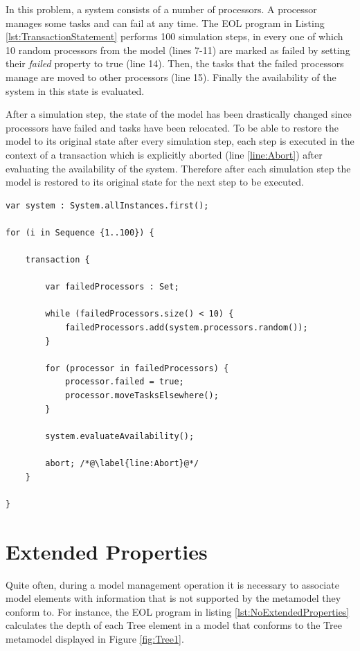 In this problem, a system consists of a number of processors. A processor manages some tasks and can fail at any time. The EOL program in Listing \ref{lst:TransactionStatement} performs 100 simulation steps, in every one of which 10 random processors from the model (lines 7-11) are marked as failed by setting their \emph{failed} property to true (line 14). Then, the tasks that the failed processors manage are moved to other processors (line 15). Finally the availability of the system in this state is evaluated.

After a simulation step, the state of the model has been drastically changed since processors have failed and tasks have been relocated. To be able to restore the model to its original state after every simulation step, each step is executed in the context of a transaction which is explicitly aborted (line \ref{line:Abort}) after evaluating the availability of the system. Therefore after each simulation step the model is restored to its original state for the next step to be executed.

\begin{lstlisting}[basicstyle=\ttfamily\footnotesize, flexiblecolumns=true, numbers=none, nolol=true, caption=Example of a for statement, label=lst:TransactionStatement, numbers=left, language=EOL, tabsize=2]
var system : System.allInstances.first();

for (i in Sequence {1..100}) {

	transaction {
		
		var failedProcessors : Set; 
		
		while (failedProcessors.size() < 10) {
			failedProcessors.add(system.processors.random());
		}
		
		for (processor in failedProcessors) {
			processor.failed = true;
			processor.moveTasksElsewhere();
		}
		
		system.evaluateAvailability();
		
		abort; /*@\label{line:Abort}@*/
	}
	
}
\end{lstlisting}

\section{Extended Properties}
\label{sec:ExtendedProperties}

Quite often, during a model management operation it is necessary to associate model elements with information that is not supported by the metamodel they conform to. For instance, the EOL program in listing \ref{lst:NoExtendedProperties} calculates the depth of each Tree element in a model that conforms to the Tree metamodel displayed in Figure \ref{fig:Tree1}.


